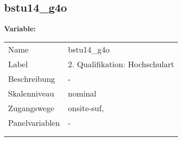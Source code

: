 	
	
	\subsection{bstu14\_g4o}
	\label{subSection:bstu14_g4o}

	\noindent\textbf{Variable:}\\
		\begin{tabular}{lL{11.3cm}}
			\label{tableVariable:bstu14_g4o}
			Name & bstu14\_g4o \\
			Label & 2. Qualifikation: Hochschulart \\
			Beschreibung & - \\
			Skalenniveau & nominal \\
			Zugangswege &
				onsite-suf,
 \\
			Panelvariablen & -
			 \\
			 \\
 \\
		\end{tabular}






